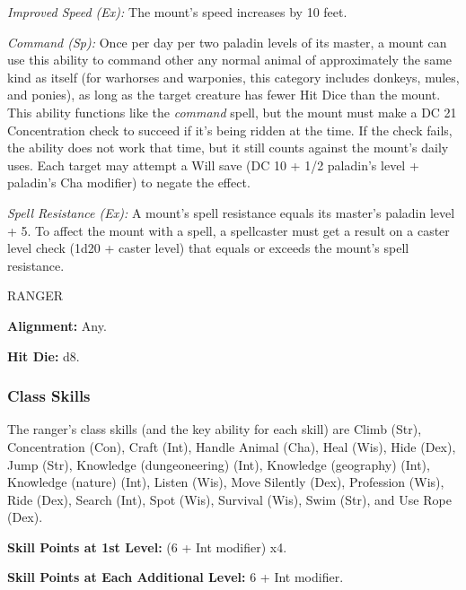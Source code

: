 \documentclass{article}
\begin{document}
\textit{Improved Speed (Ex): }The mount's speed increases by 10 feet.

\textit{Command (Sp): }Once per day per two paladin levels of its master, a mount 
can use this ability to command other any normal animal of approximately the same 
kind as itself (for warhorses and warponies, this category includes donkeys, mules, 
and ponies), as long as the target creature has fewer Hit Dice than the mount. 
This ability functions like the \textit{command }spell, but the mount must make 
a DC 21 Concentration check to succeed if it's being ridden at the time. If the 
check fails, the ability does not work that time, but it still counts against the 
mount's daily uses. Each target may attempt a Will save (DC 10 + 1/2 paladin's 
level + paladin's Cha modifier) to negate the effect.

\textit{Spell Resistance (Ex): }A mount's spell resistance equals its master's 
paladin level + 5. To affect the mount with a spell, a spellcaster must get a result 
on a caster level check (1d20 + caster level) that equals or exceeds the mount's 
spell resistance.

\vspace{12pt}
{\LARGE{}RANGER}

\textbf{Alignment:} Any.

\textbf{Hit Die:} d8.

\vspace{12pt}
\subsubsection*{\textbf{Class Skills}}

The ranger's class skills (and the key ability for each skill) are Climb (Str), 
Concentration (Con), Craft (Int), Handle Animal (Cha), Heal (Wis), Hide (Dex), 
Jump (Str), Knowledge (dungeoneering) (Int), Knowledge (geography) (Int), Knowledge 
(nature) (Int), Listen (Wis), Move Silently (Dex), Profession (Wis), Ride (Dex), 
Search (Int), Spot (Wis), Survival (Wis), Swim (Str), and Use Rope (Dex).

\textbf{Skill Points at 1st Level:} (6 + Int modifier) x$ $4.

\textbf{Skill Points at Each Additional Level:} 6 + Int modifier.
\end{document}
